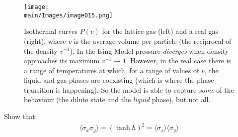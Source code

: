 \documentclass[../../main.tex]{subfiles}
\begin{document}
\begin{figure}[H]
    \centering
    \texttt{[image: \\main/Images/image015.png]}
    \caption{Isothermal curves $P(v)$ for the lattice gas (left) and a real gas (right), where $v$ is the average volume per particle (the reciprocal of the density $v^{-1}$). In the Ising Model pressure \textit{diverges} when density approaches its maximum $v^{-1} \to 1$. However, in the real case there is a range of temperatures at which, for a range of values of $v$, the liquid and gas phases are coexisting (which is where the phase transition is happening). So the model is able to capture \textit{some} of the behaviour (the dilute  state and the \textit{liquid} phase), but not all. 
    \label{fig:pressure}} 
\end{figure} 

\begin{exo}
    Show that:
    \begin{align*}
        \langle \sigma_x \sigma_y \rangle = (\tanh h)^2 = \langle \sigma_x \rangle \langle \sigma_y \rangle
    \end{align*} %
\end{exo}
\end{document}

